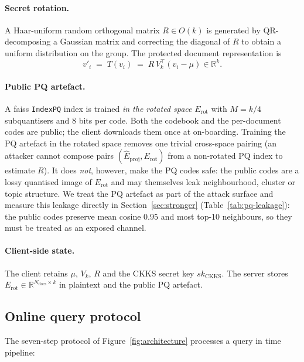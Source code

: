 \documentclass[11pt,a4paper]{article}
\begin{document}
\paragraph{Secret rotation.} A Haar-uniform random orthogonal matrix
$R \in O(k)$ is generated by QR-decomposing a Gaussian matrix and
correcting the diagonal of $R$ to obtain a uniform distribution on the
group. The protected document representation is
\[
v'_i \;=\; T(v_i) \;=\; R\, V_k^\top (v_i - \mu) \in \mathbb{R}^k .
\]

\paragraph{Public PQ artefact.} A faiss \texttt{IndexPQ} index is trained
\emph{in the rotated space} $E_{\mathrm{rot}}$ with $M = k/4$ subquantisers
and $8$ bits per code. Both the codebook and the per-document codes are
public; the client downloads them once at on-boarding. Training the PQ
artefact in the rotated space removes one trivial cross-space pairing
(an attacker cannot compose pairs
$(\hat E_{\mathrm{proj}}, E_{\mathrm{rot}})$ from a non-rotated PQ index
to estimate $R$). It does \emph{not}, however, make the PQ codes safe:
the public codes are a lossy quantised image of $E_{\mathrm{rot}}$ and
may themselves leak neighbourhood, cluster or topic structure. We treat
the PQ artefact as part of the attack surface and measure this leakage
directly in Section~\ref{sec:stronger} (Table~\ref{tab:pq-leakage}): the
public codes preserve mean cosine $0.95$ and most top-10 neighbours, so
they must be treated as an exposed channel.

\paragraph{Client-side state.} The client retains $\mu$, $V_k$, $R$ and
the CKKS secret key $sk_{\mathrm{CKKS}}$. The server stores
$E_{\mathrm{rot}} \in \mathbb{R}^{N_{\mathrm{docs}} \times k}$ in plaintext
and the public PQ artefact.

\subsection{Online query protocol}\label{ssec:online}

The seven-step protocol of Figure~\ref{fig:architecture} processes a query
in time pipeline:
\end{document}
